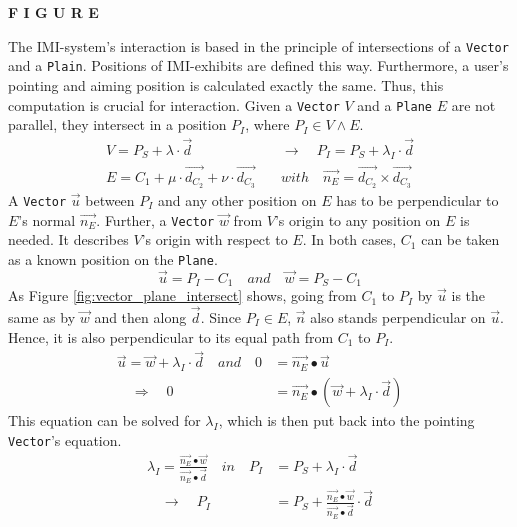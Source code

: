 \textbf{F I G U R E}

The \ac{IMI}-system's interaction is based in the principle of intersections of a \texttt{Vector} and a \texttt{Plain}. Positions of \ac{IMI}-exhibits are defined this way. Furthermore, a user's pointing and aiming position is calculated exactly the same. Thus, this computation is crucial for interaction. Given a \texttt{Vector} $V$ and a \texttt{Plane} $E$ are not parallel, they intersect in a position $P_{I}$, where $P_{I} \in V \wedge E$.   
\begin{align*}
	V = P_{S} + \lambda \cdot \overrightarrow{d} \quad &\to \quad P_{I} = P_{S} + \lambda_{I} \cdot \overrightarrow{d} \\
	E = C_{1} + \mu \cdot \overrightarrow{d_{C_{2}}} + \nu \cdot \overrightarrow{d_{C_{3}}} \quad &with \quad \overrightarrow{n_{E}} = \overrightarrow{d_{C_{2}}} \times \overrightarrow{d_{C_{3}}}
\end{align*}
A \texttt{Vector} $\overrightarrow{u}$ between $P_{I}$ and any other position on $E$ has to be perpendicular to $E$'s normal $\overrightarrow{n_{E}}$. Further, a \texttt{Vector} $\overrightarrow{w}$ from $V$'s origin to any position on $E$ is needed. It describes $V$'s origin with respect to $E$. In both cases, $C_{1}$ can be taken as a known position on the \texttt{Plane}.
$$\overrightarrow{u} = P_{I} - C_{1} \quad and \quad \overrightarrow{w} = P_{S} - C_{1}$$
As Figure \ref{fig:vector_plane_intersect} shows, going from $C_{1}$ to $P_{I}$ by $\overrightarrow{u}$ is the same as by $\overrightarrow{w}$ and then along $\overrightarrow{d}$. Since $P_{I} \in E$, $\overrightarrow{n}$ also stands perpendicular on $\overrightarrow{u}$. Hence, it is also perpendicular to its equal path from $C_{1}$ to $P_{I}$.
\begin{align*}
	\overrightarrow{u} = \overrightarrow{w} + \lambda_{I} \cdot \overrightarrow{d} \quad and \quad 0 &= \overrightarrow{n_{E}} \bullet \overrightarrow{u} \\
	\quad \Rightarrow \quad 0 &= \overrightarrow{n_{E}} \bullet (\overrightarrow{w} + \lambda_{I} \cdot \overrightarrow{d})
\end{align*}
This equation can be solved for $\lambda_{I}$, which is then put back into the pointing \texttt{Vector}'s equation.
\begin{align*}
	\lambda_{I} = \frac{\overrightarrow{n_{E}} \bullet \overrightarrow{w}}{\overrightarrow{n_{E}} \bullet \overrightarrow{d}} \quad in \quad P_{I} &= P_{S} + \lambda_{I} \cdot \overrightarrow{d} \\	
	\quad \to \quad P_{I} &= P_{S} + \frac{\overrightarrow{n_{E}} \bullet \overrightarrow{w}}{\overrightarrow{n_{E}} \bullet \overrightarrow{d}} \cdot \overrightarrow{d}
\end{align*}

